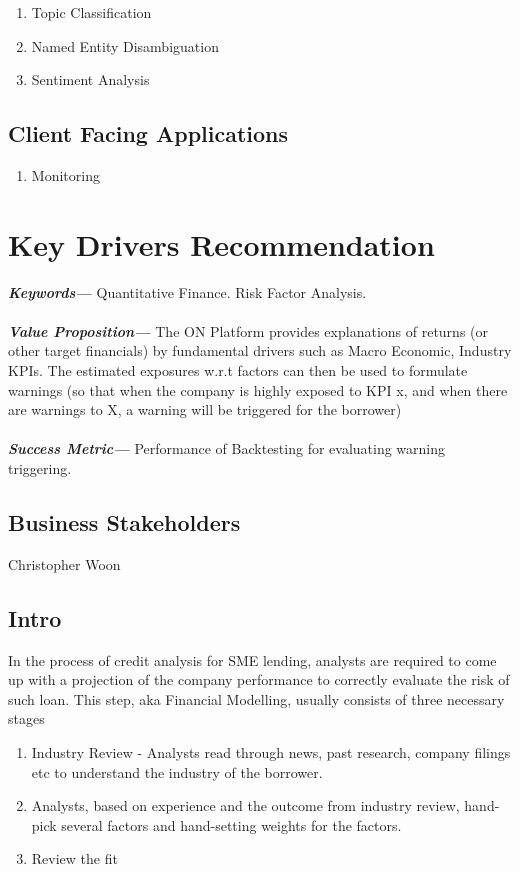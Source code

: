 \documentclass[]{article}
\providecommand{\keywords}[1]{\textbf{\textit{Keywords---}} #1}
\providecommand{\values}[1]{\textbf{\textit{Value Proposition---}} #1}
\providecommand{\successmetric}[1]{\textbf{\textit{Success Metric---}} #1}
\begin{document}
\begin{enumerate}
    \item Topic Classification
    \item Named Entity Disambiguation
    \item Sentiment Analysis
\end{enumerate}

\subsection{Client Facing Applications}
\begin{enumerate}
    \item Monitoring
\end{enumerate}

\newpage

\section{Key Drivers Recommendation}
\keywords{Quantitative Finance. Risk Factor Analysis.}
\\\\
\noindent
\values{The ON Platform provides explanations of returns 
(or other target financials) by fundamental drivers such as Macro Economic, 
Industry  KPIs. The estimated exposures w.r.t factors can then be used to 
formulate warnings (so that when the company is highly exposed to KPI x, and 
when there are warnings to X, a warning will be triggered for the borrower)}
\\\\
\noindent
\successmetric{ Performance of Backtesting for evaluating warning 
triggering.}

\subsection{Business Stakeholders}
Christopher Woon
\subsection{Intro}

In the process of credit analysis for SME lending, analysts are required to 
come up with a projection of the company performance to correctly evaluate the 
risk of such loan. This step, aka Financial Modelling, usually consists of 
three necessary stages

\begin{enumerate}
    \item Industry Review - Analysts read through news, past research, company 
    filings etc to understand the industry of the borrower.
    \item Analysts, based on experience and the outcome from industry review, 
    hand-pick several factors and hand-setting weights for the factors. 
    \item Review the fit
\end{enumerate}
\end{document}
